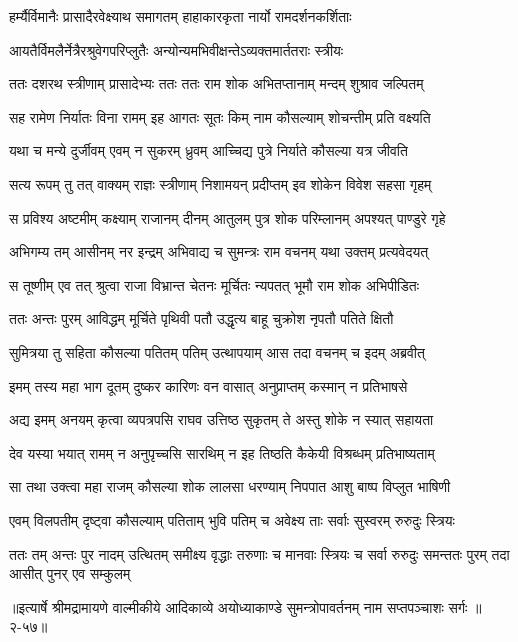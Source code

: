 \twolineshloka
{हर्म्यैर्विमानैः प्रासादैरवेक्ष्याथ समागतम्}
{हाहाकारकृता नार्यो रामदर्शनकर्शिताः} %

\twolineshloka
{आयतैर्विमलैर्नेत्रैरश्रुवेगपरिप्लुतैः}
{अन्योन्यमभिवीक्षन्तेऽव्यक्तमार्ततराः स्त्रीयः} %

\twolineshloka
{ततः दशरथ स्त्रीणाम् प्रासादेभ्यः ततः ततः}
{राम शोक अभितप्तानाम् मन्दम् शुश्राव जल्पितम्} %

\twolineshloka
{सह रामेण निर्यातः विना रामम् इह आगतः}
{सूतः किम् नाम कौसल्याम् शोचन्तीम् प्रति वक्ष्यति} %

\twolineshloka
{यथा च मन्ये दुर्जीवम् एवम् न सुकरम् ध्रुवम्}
{आच्चिद्य पुत्रे निर्याते कौसल्या यत्र जीवति} %

\twolineshloka
{सत्य रूपम् तु तत् वाक्यम् राज्ञः स्त्रीणाम् निशामयन्}
{प्रदीप्तम् इव शोकेन विवेश सहसा गृहम्} %

\twolineshloka
{स प्रविश्य अष्टमीम् कक्ष्याम् राजानम् दीनम् आतुलम्}
{पुत्र शोक परिम्लानम् अपश्यत् पाण्डुरे गृहे} %

\twolineshloka
{अभिगम्य तम् आसीनम् नर इन्द्रम् अभिवाद्य च}
{सुमन्त्रः राम वचनम् यथा उक्तम् प्रत्यवेदयत्} %

\twolineshloka
{स तूष्णीम् एव तत् श्रुत्वा राजा विभ्रान्त चेतनः}
{मूर्चितः न्यपतत् भूमौ राम शोक अभिपीडितः} %

\twolineshloka
{ततः अन्तः पुरम् आविद्धम् मूर्चिते पृथिवी पतौ}
{उद्धृत्य बाहू चुक्रोश नृपतौ पतिते क्षितौ} %

\twolineshloka
{सुमित्रया तु सहिता कौसल्या पतितम् पतिम्}
{उत्थापयाम् आस तदा वचनम् च इदम् अब्रवीत्} %

\twolineshloka
{इमम् तस्य महा भाग दूतम् दुष्कर कारिणः}
{वन वासात् अनुप्राप्तम् कस्मान् न प्रतिभाषसे} %

\twolineshloka
{अद्य इमम् अनयम् कृत्वा व्यपत्रपसि राघव}
{उत्तिष्ठ सुकृतम् ते अस्तु शोके न स्यात् सहायता} %

\twolineshloka
{देव यस्या भयात् रामम् न अनुपृच्चसि सारथिम्}
{न इह तिष्ठति कैकेयी विश्रब्धम् प्रतिभाष्यताम्} %

\twolineshloka
{सा तथा उक्त्वा महा राजम् कौसल्या शोक लालसा}
{धरण्याम् निपपात आशु बाष्प विप्लुत भाषिणी} %

\twolineshloka
{एवम् विलपतीम् दृष्ट्वा कौसल्याम् पतिताम् भुवि}
{पतिम् च अवेक्ष्य ताः सर्वाः सुस्वरम् रुरुदुः स्त्रियः} %

\fourlineindentedshloka
{ततः तम् अन्तः पुर नादम् उत्थितम्}
{समीक्ष्य वृद्धाः तरुणाः च मानवाः}
{स्त्रियः च सर्वा रुरुदुः समन्ततः}
{पुरम् तदा आसीत् पुनर् एव सम्कुलम्} %


॥इत्यार्षे श्रीमद्रामायणे वाल्मीकीये आदिकाव्ये अयोध्याकाण्डे सुमन्त्रोपावर्तनम् नाम सप्तपञ्चाशः सर्गः ॥२-५७॥
